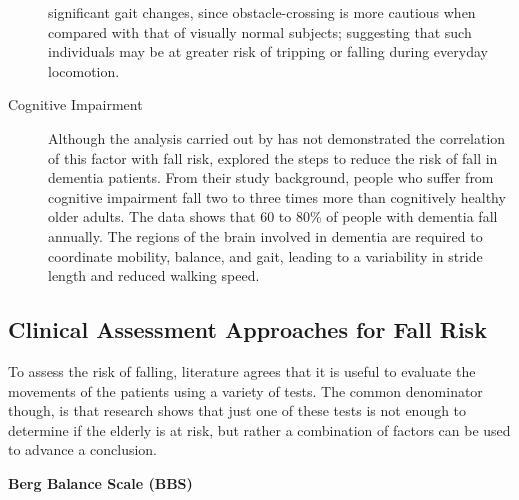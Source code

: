 \begin{description}
  significant gait changes, since obstacle-crossing is more cautious when compared with that of visually normal subjects; 
  suggesting that such individuals may be at greater risk of tripping or falling during everyday locomotion.
  \item[Cognitive Impairment] Although the analysis carried out by \cite{RiskFactors} has not demonstrated the correlation of this factor with fall risk, \cite{CognitiveRisk} explored the steps to reduce the risk of fall in dementia patients. From their study background, people who suffer from cognitive impairment fall two to three times more than cognitively healthy older adults. The data shows that 60 to 80\% of people with dementia fall annually. The regions of the brain involved in dementia are required to coordinate mobility, balance, and gait, leading to a variability in stride length and reduced walking speed.
\end{description}

\subsection{Clinical Assessment Approaches for Fall Risk}
To assess the risk of falling, literature agrees that it is useful to evaluate the movements of the patients using a variety of tests. The common denominator though, is that research shows that just one of these tests is not enough to determine if the elderly is at risk, but rather a combination of factors can be used to advance a conclusion.

\vspace{0.3cm}
\textbf{Berg Balance Scale (BBS)} %

